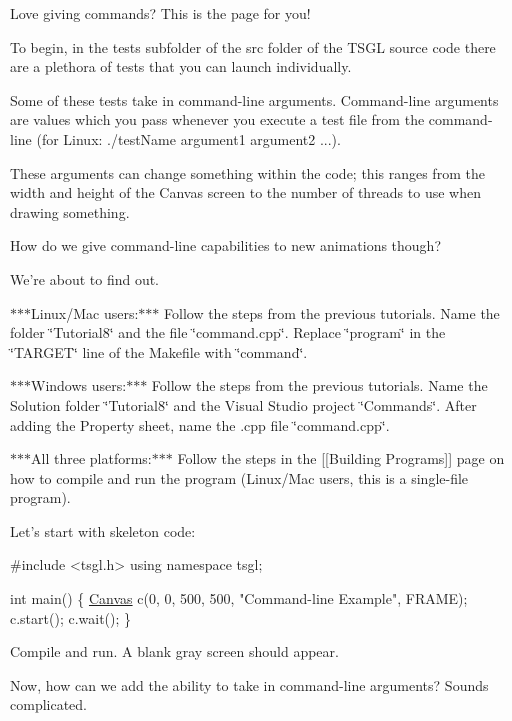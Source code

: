 Love giving commands? This is the page for you!

To begin, in the {\ttfamily tests} subfolder of the {\ttfamily src} folder of the T\-S\-G\-L source code there are a plethora of tests that you can launch individually.

Some of these tests take in command-\/line arguments. Command-\/line arguments are values which you pass whenever you execute a test file from the command-\/line (for Linux\-: ./test\-Name argument1 argument2 ...).

These arguments can change something within the code; this ranges from the width and height of the Canvas screen to the number of threads to use when drawing something.

How do we give command-\/line capabilities to new animations though?

We're about to find out.

$\ast$$\ast$$\ast$\-Linux/\-Mac users\-:$\ast$$\ast$$\ast$ Follow the steps from the previous tutorials. Name the folder \char`\"{}\-Tutorial8\char`\"{} and the file \char`\"{}command.\-cpp\char`\"{}. Replace \char`\"{}program\char`\"{} in the \char`\"{}\-T\-A\-R\-G\-E\-T\char`\"{} line of the Makefile with \char`\"{}command\char`\"{}.

$\ast$$\ast$$\ast$\-Windows users\-:$\ast$$\ast$$\ast$ Follow the steps from the previous tutorials. Name the Solution folder \char`\"{}\-Tutorial8\char`\"{} and the Visual Studio project \char`\"{}\-Commands\char`\"{}. After adding the Property sheet, name the .cpp file \char`\"{}command.\-cpp\char`\"{}.

$\ast$$\ast$$\ast$\-All three platforms\-:$\ast$$\ast$$\ast$ Follow the steps in the \mbox{[}\mbox{[}Building Programs\mbox{]}\mbox{]} page on how to compile and run the program (Linux/\-Mac users, this is a single-\/file program).

Let's start with skeleton code\-:


\begin{DoxyCode}
\textcolor{preprocessor}{#include <tsgl.h>}
\textcolor{keyword}{using namespace }tsgl;

\textcolor{keywordtype}{int} main() \{
  \hyperlink{classtsgl_1_1_canvas}{Canvas} c(0, 0, 500, 500, \textcolor{stringliteral}{"Command-line Example"}, FRAME);
  c.start();
  c.wait();
\}
\end{DoxyCode}


Compile and run. A blank gray screen should appear.

Now, how can we add the ability to take in command-\/line arguments? Sounds complicated.

